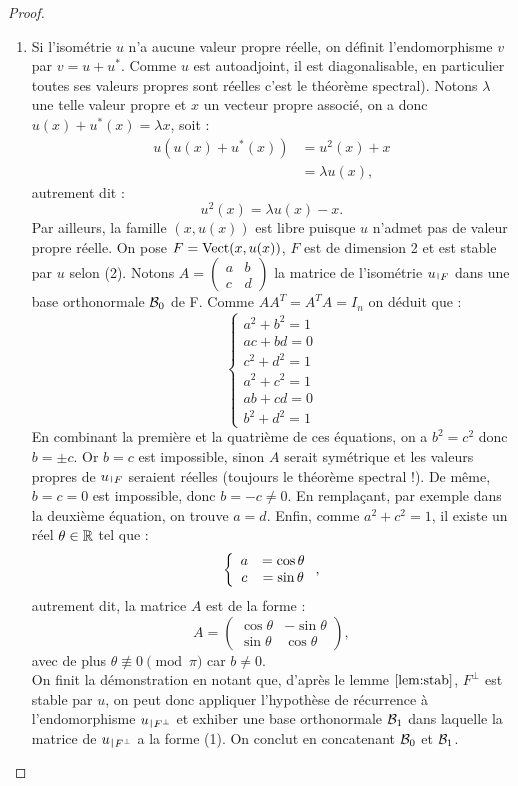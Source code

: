 \begin{proof}
\begin{enumerate}[label=(\alph*)]
\item 
Si l'isométrie $u$ n'a aucune valeur propre réelle, on définit l'endomorphisme $v$ par $v=u+u^{\ast}$.
Comme $u$ est autoadjoint, il est diagonalisable, en particulier toutes ses valeurs propres sont réelles c'est le théorème spectral).
Notons $\lambda$ une telle valeur propre et $x$ un vecteur propre associé, on a donc $u(x) + u^{\ast}(x) = \lambda x$, soit :
\begin{align*}
u(u(x) + u^{\ast}(x)) & = u^2(x) + x \\
& = \lambda u(x) ,
\end{align*}
autrement dit :
\begin{equation}
u^2(x) = \lambda u(x) -  x .
\end{equation}
Par ailleurs, la famille $(x, u(x))$ est libre puisque $u$ n'admet pas de valeur propre réelle. 
On pose $F = \operatorname{Vect}(x, u(x))$, $F$ est de dimension 2 et est stable par $u$ selon (2).
Notons $A = \begin{pmatrix} a & b \\ c & d \end{pmatrix}$ la matrice de l'isométrie $\restr{u}{F}$ dans une base orthonormale $\mathcal{B}_0$
de F. Comme $A A^{T} = A^{T} A = I_n$ on déduit que :
\[ \left \{ \begin{array}{c}
a^2 + b^2 = 1 \\
ac + bd = 0 \\
c^2 + d^2 = 1 \\
a^2 + c^2 = 1 \\
ab + cd = 0 \\
b^2 + d^2 = 1 
\end{array} \right . \]
En combinant la première et la quatrième de ces équations, on a $b^2 = c^2$ donc $b = \pm c$.
Or $b=c$ est impossible, sinon $A$ serait symétrique et les valeurs propres de $\restr{u}{F}$ seraient réelles 
(toujours le théorème spectral !). De même, $b=c=0$ est impossible, donc $b=-c \neq 0$.
En remplaçant, par exemple dans la deuxième équation, on trouve $a=d$.
Enfin, comme $a^2 + c^2 = 1$, il existe un réel $\theta \in \mathbb{R}$ tel que :
\[ \left \{ \begin{array}{c c}
a & = \cos{\theta} \\
c & = \sin{\theta}
\end{array} \right . , \]
autrement dit, la matrice $A$ est de la forme :
\[ A = \begin{pmatrix} \cos{\theta} & - \sin{\theta} \\ \sin{\theta} & \cos{\theta} \end{pmatrix} , \]
avec de plus $\theta \not \equiv 0 \pmod \pi$ car $b \neq 0$. \\
On finit la démonstration en notant que, d'après le lemme $\ref{lem:stab}$, $F^{\perp}$ est stable par $u$, on peut donc appliquer
l'hypothèse de récurrence à l'endomorphisme $\restr{u}{F^{\perp}}$ et exhiber une base orthonormale $\mathcal{B}_1$ dans laquelle
la matrice de $\restr{u}{F^{\perp}}$ a la forme (1). On conclut en concatenant $\mathcal{B}_0$ et $\mathcal{B}_1$.
\end{enumerate}
\end{proof}

